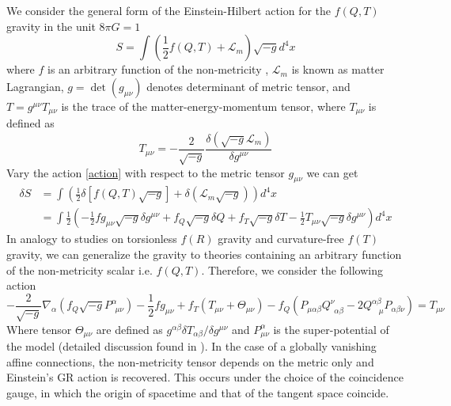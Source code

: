 \documentclass[a4paper,fleqn]{cas-sc}
\begin{document}
We consider the general form of the Einstein-Hilbert action for the $f(Q,T)$ gravity in the unit $8\pi G=1$
\begin{equation}
S=\int(\frac{1}{2}f(Q,T)+\mathcal{L}_m) \sqrt{-g}  d^4x \label{action}
\end{equation}
where $f$ is an arbitrary function of the non-metricity , $\mathcal{L}_m$ is known as matter Lagrangian, $g=\det (g_{\mu \nu})$ denotes determinant of metric tensor, and $T=g^{\mu \nu}T_{\mu \nu}$ is the trace of the matter-energy-momentum tensor, where $T_{\mu \nu}$ is defined as
\begin{equation}
    T_{\mu \nu}=-\frac{2}{\sqrt{-g}}\frac{\delta(\sqrt{-g}\mathcal{L}_m)}{\delta g^{\mu \nu}}
\end{equation}
Vary the action \eqref{action} with respect to the metric tensor $g_{\mu\nu}$ we can get
\begin{align}
\delta S&=\int \left(\frac{1}{2} \delta[f(Q,T) \sqrt{-g}]+\delta(\mathcal{L}_m \sqrt{-g})\right)d^4x \\
&= \int \frac{1}{2}\left(-\frac{1}{2}f g_{\mu\nu}\sqrt{-g}\delta g^{\mu\nu}+f_Q \sqrt{-g} \delta Q+f_T \sqrt{-g}\delta T -\frac{1}{2}T_{\mu \nu}\sqrt{-g}\delta g^{\mu\nu}\right)d^4x
\end{align}
In analogy to studies on torsionless $f(R)$ gravity and curvature-free $f(T)$ gravity, we can generalize the gravity to theories containing an arbitrary function of the non-metricity scalar i.e. $f(Q,T)$. Therefore, we consider the following action
\begin{equation}
-\frac{2}{\sqrt{-g}}\nabla_\alpha(f_Q \sqrt{-g}P^\alpha_{\ \ \mu \nu})-\frac{1}{2}f g_{\mu \nu}+f_T(T_{\mu \nu}+\Theta_{\mu \nu})-f_Q(P_{\mu \alpha \beta}Q^\nu_{\ \ \alpha \beta}-2Q^{\alpha \beta}_{\ \ \ \ \mu}P_{\alpha \beta \nu})=T_{\mu \nu}\label{FieldEq}
\end{equation}
Where tensor $\Theta_{\mu \nu}$ are defined as $g^{\alpha\beta}\delta T_{\alpha\beta}/{\delta g^{\mu\nu}}$ and $P^{\alpha}_{\mu\nu}$ is the super-potential of the model (detailed discussion found in \cite{Xu_2019}). In the case of a globally vanishing affine connections, the non-metricity tensor depends on the metric only and Einstein's GR action is recovered. This occurs under the choice of the coincidence gauge, in which the origin of spacetime and that of the tangent space coincide. 
\end{document}

